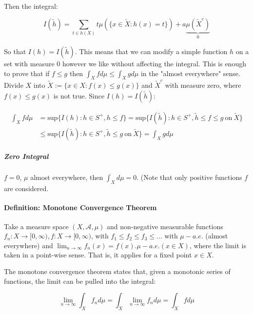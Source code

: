 Then the integral:

\begin{equation}
I (\tilde{h}) = \sum_{t\in h(X)} t \mu( \{ x\in \tilde{X} : h(x) = t \}) + a \underbrace{\mu(\tilde{X}^c)}_{0}
\end{equation}

So that $I(h) = I(\tilde{h})$. This means that we can modify a simple function $h$ on a set with measure $0$ however we like without affecting the integral. This is enough to prove that if $f\leq g$ then $\int_X f d\mu \leq \int_X g d\mu$ in the "almost everywhere" sense. Divide $X$ into $\tilde{X}:= \{x \in X: f(x) \leq g(x) \}$ and $\tilde{X}^c$ with measure zero, where $f(x) \leq g(x)$ is not true. Since $I(h) = I(\tilde{h})$:

\begin{equation}
\begin{array}{rl}
\int_X f d\mu &= \mathrm{sup}\{ I(h): h\in S^+, h\leq f \} =  \mathrm{sup}\{ I(\tilde{h}): h\in S^+, \tilde{h}\leq f \leq g\mathrm{\ on\ }\tilde{X}\}\\
&\leq \mathrm{sup}\{ I(\tilde{h}): h\in S^+, \tilde{h}\leq g\mathrm{\ on\ }\tilde{X}\} = \int_X g d\mu
\end{array}
\end{equation}

\subparagraph{Zero Integral}
$f=0$, $\mu$ almost everywhere, then $\int_X d\mu = 0$. (Note that only positive functions $f$ are considered.




\paragraph{Definition: Monotone Convergence Theorem}

Take a measure space $(X,\mathscr{A},\mu)$ and non-negative measurable functions $f_n: X \rightarrow [0,\infty), f: X \rightarrow [0,\infty)$, with $f_1 \leq f_2 \leq f_3 \leq ... $ with $\mu-a.e.$ (almost everywhere) and $\lim_{n\rightarrow \infty} f_n(x) = f(x). \mu-a.e. (x\in X)$, where the limit is taken in a point-wise sense. That is, it applies for a fixed point $x\in X$.

The monotone convergence theorem states that, given a monotonic series of functions, the limit can be pulled into the integral:

\begin{equation}
\lim_{n\rightarrow \infty} \int_X f_n d\mu = \int_X \lim_{n\rightarrow \infty} f_n d\mu = \int_X f d\mu
\end{equation}

